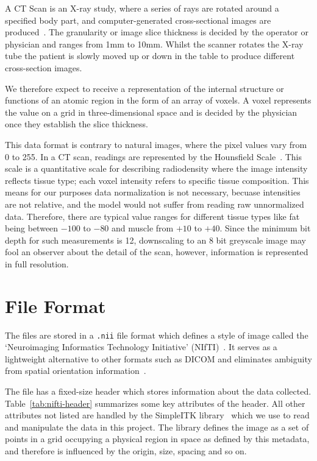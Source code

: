 \documentclass[12pt,twoside]{report}
\begin{document}
A CT Scan is an X-ray study, where a series of rays are rotated around a specified body part, and computer-generated cross-sectional images are produced~\cite{file-formats}. The granularity or image slice thickness is decided by the operator or physician and ranges from 1mm to 10mm. Whilst the scanner rotates the X-ray tube the patient is slowly moved up or down in the table to produce different cross-section images.

We therefore expect to receive a representation of the internal structure or functions of an atomic region in the form of an array of voxels. A voxel represents the value on a grid in three-dimensional space and is decided by the physician once they establish the slice thickness.

This data format is contrary to natural images, where the pixel values vary from 0 to 255. In a CT scan, readings are represented by the Hounsfield Scale~\cite{diagnostic-radiology-physics}. This scale is a quantitative scale for describing radiodensity where the image intensity reflects tissue type; each voxel intensity refers to specific tissue composition. This means for our purposes data normalization is not necessary, becuase intensities are not relative, and the model would not suffer from reading raw unnormalized data. Therefore, there are typical value ranges for different tissue types like fat being between $-100$ to $-80$ and muscle from $+10$ to $+40$. Since the minimum bit depth for such measurements is 12, downscaling to an 8 bit greyscale image may fool an observer about the detail of the scan, however, information is represented in full resolution.

\section{File Format}\label{sec:data-file-format}

The files are stored in a \texttt{.nii} file format which defines a style of image called the `Neuroimaging Informatics Technology Initiative' (NIfTI)~\cite{file-formats}. It serves as a lightweight alternative to other formats such as DICOM and eliminates ambiguity from spatial orientation information~\cite{dicom-to-nifti-conversion}.

The file has a fixed-size header which stores information about the data collected. Table~\ref{tab:nifti-header} summarizes some key attributes of the header. All other attributes not listed are handled by the SimpleITK library~\cite{SimpleITK-paper} which we use to read and manipulate the data in this project. The library defines the image as a set of points in a grid occupying a physical region in space as defined by this metadata, and therefore is influenced by the origin, size, spacing and so on.
\end{document}
